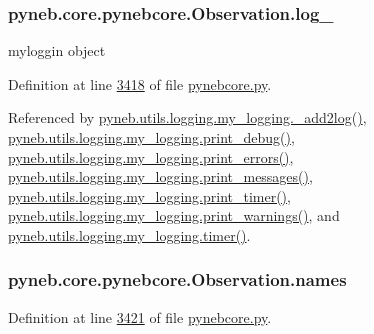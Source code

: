 \hypertarget{classpyneb_1_1core_1_1pynebcore_1_1_observation_a882b7909bc881e0c212dd5085305f4d4}{}
\subsubsection[{log\+\_\+}]{\setlength{\rightskip}{0pt plus 5cm}pyneb.\+core.\+pynebcore.\+Observation.\+log\+\_\+}\label{classpyneb_1_1core_1_1pynebcore_1_1_observation_a882b7909bc881e0c212dd5085305f4d4}


myloggin object 



Definition at line \hyperlink{pynebcore_8py_source_l03418}{3418} of file \hyperlink{pynebcore_8py_source}{pynebcore.\+py}.



Referenced by \hyperlink{logging_8py_source_l00059}{pyneb.\+utils.\+logging.\+my\+\_\+logging.\+\_\+add2log()}, \hyperlink{logging_8py_source_l00157}{pyneb.\+utils.\+logging.\+my\+\_\+logging.\+print\+\_\+debug()}, \hyperlink{logging_8py_source_l00149}{pyneb.\+utils.\+logging.\+my\+\_\+logging.\+print\+\_\+errors()}, \hyperlink{logging_8py_source_l00133}{pyneb.\+utils.\+logging.\+my\+\_\+logging.\+print\+\_\+messages()}, \hyperlink{logging_8py_source_l00165}{pyneb.\+utils.\+logging.\+my\+\_\+logging.\+print\+\_\+timer()}, \hyperlink{logging_8py_source_l00141}{pyneb.\+utils.\+logging.\+my\+\_\+logging.\+print\+\_\+warnings()}, and \hyperlink{logging_8py_source_l00115}{pyneb.\+utils.\+logging.\+my\+\_\+logging.\+timer()}.

\hypertarget{classpyneb_1_1core_1_1pynebcore_1_1_observation_a3f365d0b1488b2eba300bf71caf23c17}{}
\subsubsection[{names}]{\setlength{\rightskip}{0pt plus 5cm}pyneb.\+core.\+pynebcore.\+Observation.\+names}\label{classpyneb_1_1core_1_1pynebcore_1_1_observation_a3f365d0b1488b2eba300bf71caf23c17}


Definition at line \hyperlink{pynebcore_8py_source_l03421}{3421} of file \hyperlink{pynebcore_8py_source}{pynebcore.\+py}.



